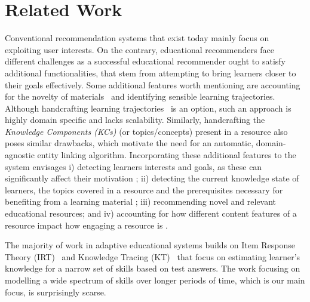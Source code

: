 \documentclass[letterpaper]{article} %
\begin{document}
\section{Related Work} \label{topic:related_work}

Conventional recommendation systems that exist today mainly focus on exploiting user interests. On the contrary, educational recommenders face different challenges as a successful educational recommender ought to satisfy additional functionalities, that stem from attempting to bring learners closer to their goals effectively. Some
additional features worth mentioning are accounting for the novelty of materials~\cite{Drachsler:edurec} and identifying sensible learning trajectories.
Although handcrafting learning trajectories~\cite{bauman2018recommending} is an option, such an approach is highly domain specific and lacks scalability. Similarly, handcrafting the \emph{Knowledge Components (KCs)} (or topics/concepts) present in a resource also poses similar drawbacks, which motivate the need for an automatic, domain-agnostic entity linking algorithm.
Incorporating these additional features to the system envisages i) detecting learners interests and goals, as these can significantly affect their motivation \cite{Salehi2014}; ii) detecting the current knowledge state of learners, the topics covered in a resource and the prerequisites necessary for benefiting from a learning material \cite{bauman2018recommending}; iii) recommending novel and relevant educational resources; and iv) accounting for how different content features of a resource impact how engaging a resource is
\cite{quality_features,Guo_vid_prod}.


The majority of work in adaptive educational systems builds on Item Response Theory (IRT)~\cite{Rasch1960,Pelanek2017} and Knowledge Tracing (KT)~\cite{yudelson2013individualized} that focus on estimating learner's knowledge for a narrow set of skills based on test answers. The work focusing on modelling a wide spectrum of skills over longer periods of time, which is our main focus, is surprisingly scarse.
\end{document}
